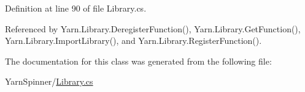 Definition at line 90 of file Library.\-cs.



Referenced by Yarn.\-Library.\-Deregister\-Function(), Yarn.\-Library.\-Get\-Function(), Yarn.\-Library.\-Import\-Library(), and Yarn.\-Library.\-Register\-Function().



The documentation for this class was generated from the following file\-:\begin{DoxyCompactItemize}
\item 
Yarn\-Spinner/\hyperlink{a00299}{Library.\-cs}\end{DoxyCompactItemize}

